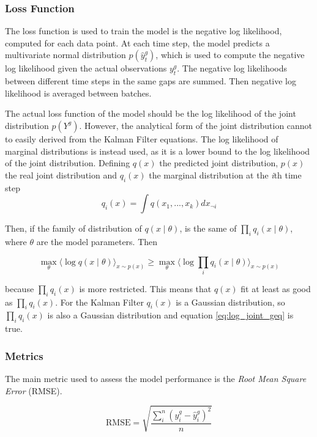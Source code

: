 \documentclass{article}
\newcommand{\E}[1]{\langle #1 \rangle} %
\begin{document}
\subsubsection{Loss Function}

The loss function is used to train the model is the negative log likelihood, computed for each data point. At each time step, the model predicts a multivariate normal distribution $p(\hat{y}^g_t)$, which is used to compute the negative log likelihood given the actual observations $y_t^g$. The negative log likelihoods between different time steps in the same gaps are summed. Then negative log likelihood is averaged between batches.

The actual loss function of the model should be the log likelihood of the joint distribution $p(Y^g)$. However, the analytical form of the joint distribution cannot to easily derived from the Kalman Filter equations. The log likelihood of marginal distributions is instead used, as it is a lower bound to the log likelihood of the joint distribution. Defining $q(x)$ the predicted joint distribution, $p(x)$ the real joint distribution and $q_i(x)$ the marginal distribution at the \textit{i}th time step
\begin{equation}
    q_i(x) = \int q(x_1, ..., x_k)dx_{\neg i}
\end{equation}

Then, if the family of distribution of $q(x \mid \theta)$,  is the same of $\prod_i q_i(x \mid \theta)$, where $\theta$ are the model parameters. Then

\begin{equation}\label{eq:log_joint_geq}
    \max_\theta \E{\log q(x\mid \theta)}_{x \sim p(x)} \geq \max_\theta \E{\log \prod_i q_i(x\mid \theta)}_{x \sim p(x)}
\end{equation}

because $\prod_i q_i(x)$ is more restricted. This means that $q(x)$ fit at least as good as $\prod_i q_i(x)$.
For the Kalman Filter $q_i(x)$ is a Gaussian distribution, so $\prod_i q_i(x)$ is also a Gaussian distribution and equation \ref{eq:log_joint_geq} is true.

\subsubsection{Metrics}

The main metric used to assess the model performance is the \emph{Root Mean Square Error} (RMSE). 

\begin{equation}
    \text{RMSE} = \sqrt{\frac{\sum_i^n (y^g_i - \hat{y}^g_i)^2}{n}}
\end{equation}
\end{document}
